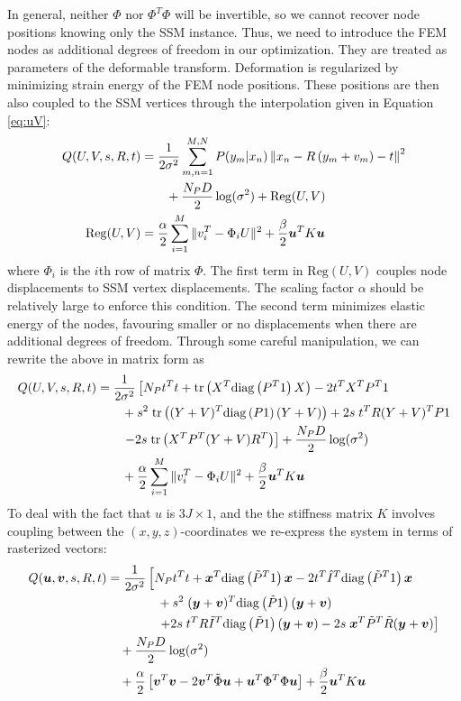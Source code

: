 \documentclass[10pt]{article}
\newcommand{\trans}[1]{#1^{T}}
\newcommand{\trace}{\mathrm{tr}}
\newcommand{\diag}{\mathrm{diag}}
\newcommand{\uvec}{\bm{u}}
\newcommand{\xvec}{\bm{x}}
\newcommand{\yvec}{\bm{y}}
\newcommand{\vvec}{\bm{v}}
\begin{document}
In general, neither $\Phi$ nor $\Phi^T\Phi$ will be invertible, so we cannot recover node positions knowing only the SSM instance.
Thus, we need to introduce the FEM nodes as additional degrees of freedom in our optimization.  They are treated as parameters of
the deformable transform.  Deformation is regularized by minimizing strain energy of the FEM node positions.  These positions
are then also coupled to the SSM vertices through the interpolation given in Equation \eqref{eq:uV}:
\begin{align}
  Q(U,V,s, R,t) & = \dfrac{1}{2\sigma^2}\sum_{m,n=1}^{M,N}P(y_m|x_n)\left\|x_n- R\left(y_m+v_m\right)-t\right\|^2 \notag\\
  & \qquad + \dfrac{N_PD}{2}\log(\sigma^2) + \mathrm{Reg}(U,V)\\
  \mathrm{Reg}(U,V) & = \dfrac{\alpha}{2}\sum_{i=1}^M\|\trans{v}_i-\Phi_iU\|^2 + \dfrac{\beta}{2}\trans{\uvec}K\uvec
\end{align}
where $\Phi_i$ is the $i$th row of matrix $\Phi$. The first term in 
$\mathrm{Reg}(U,V)$ couples node displacements to SSM vertex displacements.  The scaling factor $\alpha$ should be
relatively large to enforce this condition.  The second term minimizes elastic energy of the nodes, favouring smaller or no 
displacements when there are additional degrees of freedom.  Through some careful manipulation, we can rewrite the above in matrix
form as
\begin{align}
    Q(U,V,s, R,t) & = \dfrac{1}{2\sigma^2}\left[N_P\trans{t}t + \trace\left(\trans{X}\diag\left(\trans{P}1\right)X\right)-2\trans{t}\trans{X}\trans{P}1\right.\notag\\
    & \qquad +s^2\;\trace\left(\trans{(Y+V)}\diag\left(P1\right)(Y+V)\right) + 2s\;\trans{t}R\trans{(Y+V)}P1\notag\\
    & \qquad \left.-2s\;\trace\left(\trans{X}\trans{P}(Y+V)\trans{R}\right)\right]+\dfrac{N_PD}{2}\log(\sigma^2)\notag\\
    & \qquad + \dfrac{\alpha}{2}\sum_{i=1}^M\|\trans{v}_i-\Phi_iU\|^2 + \dfrac{\beta}{2}\trans{\uvec}K\uvec
\end{align}
To deal with the fact that $u$ is $3J\times1$, and the the stiffness matrix $K$ involves coupling between the 
$(x,y,z)$-coordinates we re-express the system in terms of rasterized vectors:
\begin{align}
    Q(\uvec,\vvec,s, R,t) & = \dfrac{1}{2\sigma^2}\left[N_P\trans{t}t + \trans{\xvec}\diag\left(\trans{\tilde{P}}1\right)\xvec-2\trans{t}\trans{\hat{I}}\diag\left(\trans{\tilde{P}}1\right)\xvec\right.\notag\\
    & \qquad\qquad + s^2\;\trans{(\yvec+\vvec)}\diag\left(\tilde{P}1\right)(\yvec+\vvec)\notag\\
    & \qquad\qquad \left. +2s\;\trans{t}R\trans{\tilde{I}}\diag\left(\tilde{P}1\right)(\yvec+\vvec) -2s\;\trans{\xvec}\trans{\tilde{P}}\tilde{R}(\yvec+\vvec)\right]\notag\\
    & \quad +\dfrac{N_PD}{2}\log(\sigma^2)\notag\\
    & \quad + \dfrac{\alpha}{2}\left[\trans{\vvec}\vvec -2\trans{\vvec}\tilde{\Phi}\uvec + \trans{\uvec}\trans{\Phi}\Phi \uvec\right] + \dfrac{\beta}{2}\trans{\uvec}K\uvec \label{eq:Qvector}
\end{align} 
\end{document}

